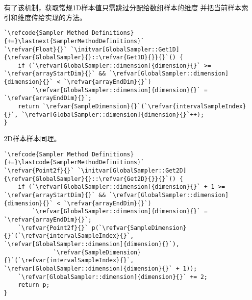 有了该机制，获取常规1D样本值只需跳过分配给数组样本的维度
并把当前样本索引和维度传给实现的方法。
\begin{lstlisting}
`\refcode{Sampler Method Definitions}{+=}\lastnext{SamplerMethodDefinitions}`
`\refvar{Float}{}` `\initvar[GlobalSampler::Get1D]{\refvar{GlobalSampler}{}::\refvar{Get1D}{}}{}`() {
    if (`\refvar[GlobalSampler::dimension]{dimension}{}` >= `\refvar{arrayStartDim}{}` && `\refvar[GlobalSampler::dimension]{dimension}{}` < `\refvar{arrayEndDim}{}`)
        `\refvar[GlobalSampler::dimension]{dimension}{}` = `\refvar{arrayEndDim}{}`;
    return `\refvar{SampleDimension}{}`(`\refvar{intervalSampleIndex}{}`, `\refvar[GlobalSampler::dimension]{dimension}{}`++);
}
\end{lstlisting}

2D样本样本同理。
\begin{lstlisting}
`\refcode{Sampler Method Definitions}{+=}\lastcode{SamplerMethodDefinitions}`
`\refvar{Point2f}{}` `\initvar[GlobalSampler::Get2D]{\refvar{GlobalSampler}{}::\refvar{Get2D}{}}{}`() {
    if (`\refvar[GlobalSampler::dimension]{dimension}{}` + 1 >= `\refvar{arrayStartDim}{}` && `\refvar[GlobalSampler::dimension]{dimension}{}` < `\refvar{arrayEndDim}{}`)
        `\refvar[GlobalSampler::dimension]{dimension}{}` = `\refvar{arrayEndDim}{}`;
    `\refvar{Point2f}{}` p(`\refvar{SampleDimension}{}`(`\refvar{intervalSampleIndex}{}`, `\refvar[GlobalSampler::dimension]{dimension}{}`),
              `\refvar{SampleDimension}{}`(`\refvar{intervalSampleIndex}{}`, `\refvar[GlobalSampler::dimension]{dimension}{}` + 1));
    `\refvar[GlobalSampler::dimension]{dimension}{}` += 2;
    return p;
}
\end{lstlisting}